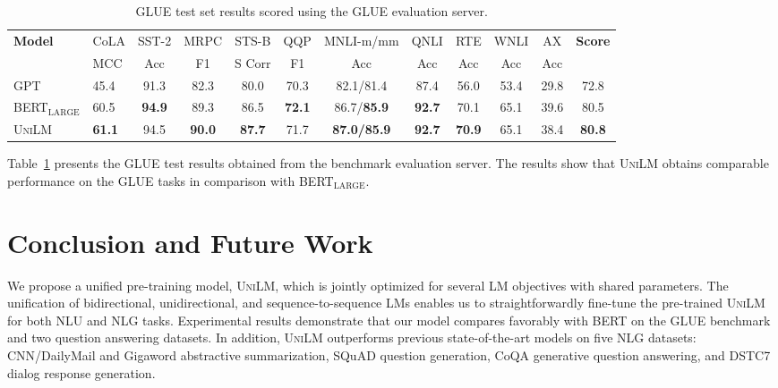\documentclass{article}
\newcommand\ours{\textsc{UniLM}}
\begin{document}
\begin{table}[t]
\centering
\small
\begin{tabular}{@{ \hskip2pt}l @{ \hskip2pt}l@{ \hskip2pt} @{ \hskip2pt}c@{ \hskip2pt} @{ \hskip2pt}c@{ \hskip2pt} @{ \hskip2pt}c@{ \hskip2pt} @{ \hskip2pt}c@{ \hskip2pt} @{ \hskip2pt}c@{ \hskip2pt} @{ \hskip1pt}c@{ \hskip1pt} @{ \hskip1pt}c @{ \hskip1pt} @{ \hskip1pt} c@{ \hskip1pt}  @{ \hskip2pt} c@{ \hskip2pt} @{ \hskip2pt} c@{ \hskip2pt}}
\toprule
\textbf{Model} &CoLA&	SST-2 &MRPC& STS-B&QQP&MNLI-m/mm&QNLI&RTE&WNLI&AX &\textbf{Score}\\ 
 &MCC &Acc &F1&S Corr&F1 &Acc &Acc &Acc &Acc &Acc & \\  \midrule
GPT &45.4 &91.3 &82.3&80.0 &70.3 &82.1/81.4 &87.4 &56.0 &53.4  &29.8 &72.8 \\
BERT$_{\text{LARGE}}$ & 60.5 &\textbf{94.9} &89.3 &86.5 &\textbf{72.1} &86.7/\textbf{85.9} & \textbf{92.7} & 70.1 &65.1	&39.6 & 80.5\\ 
\ours{} & \textbf{61.1} &94.5 &\textbf{90.0} &\textbf{87.7} &71.7 &\textbf{87.0/85.9} &\textbf{92.7} &\textbf{70.9} &65.1	&38.4 & \textbf{80.8}\\ \bottomrule
\end{tabular}
\caption{GLUE test set results scored using the GLUE evaluation server.}
\label{tbl:glue_test}
\end{table}

Table~\ref{tbl:glue_test} presents the GLUE test results obtained from the benchmark evaluation server. The results show that \ours{} obtains comparable performance on the GLUE tasks in comparison with BERT$_{\text{LARGE}}$.


\section{Conclusion and Future Work}

We propose a unified pre-training model, \ours{}, which is jointly optimized for several LM objectives with shared parameters. The unification of bidirectional, unidirectional, and sequence-to-sequence LMs enables us to straightforwardly fine-tune the pre-trained \ours{} for both NLU and NLG tasks. Experimental results demonstrate that our model compares favorably with BERT on the GLUE benchmark and two question answering datasets. 
In addition, \ours{} outperforms previous state-of-the-art models on five NLG datasets: CNN/DailyMail and Gigaword abstractive summarization, SQuAD question generation, CoQA generative question answering, and DSTC7 dialog response generation.
\end{document}
